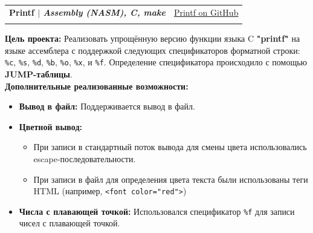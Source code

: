 \documentclass[A4,11pt]{article}
\makeatletter
\newcommand{\CVSubheading}[4]{
  \vspace{-2pt}\item
    \begin{tabular*}{0.97\textwidth}[t]{l@{\extracolsep{\fill}}r}
      \textbf{#1} & #2 \\
      \small#3 & \small #4 \\
    \end{tabular*}\vspace{-7pt}
}
\makeatother
\begin{document}
    \CVSubheading
      {{Printf} $|$ \emph{\small{Assembly (NASM), C, make}}}{\href{https://github.com/Dinichthys/Printf}{Printf on GitHub}}{}{}
      \small{
      \textbf{Цель проекта:} Реализовать упрощённую версию функции языка C \textbf{"printf"} на языке ассемблера
      с поддержкой следующих спецификаторов форматной строки:
\lstinline|%c|, \lstinline|%s|, \lstinline|%d|, \lstinline|%b|, \lstinline|%o|, \lstinline|%x|, и \lstinline|%f|.
Определение спецификатора происходило с помощью \textbf{JUMP-таблицы}.\\
\textbf{Дополнительные реализованные возможности:}
\begin{itemize}[nosep]
    \item \textbf{Вывод в файл:} Поддерживается вывод в файл.
    \item \textbf{Цветной вывод:}
    \begin{itemize}[nosep]
        \item При записи в стандартный поток вывода для смены цвета использовались escape-последовательности.
        \item При записи в файл для определения цвета текста были использованы теги HTML (например, \lstinline|<font color="red">|)
    \end{itemize}
    \item \textbf{Числа с плавающей точкой:} Использовался спецификатор \lstinline|%f| для записи чисел с плавающей точкой.
\end{itemize}

      }
\end{document}
